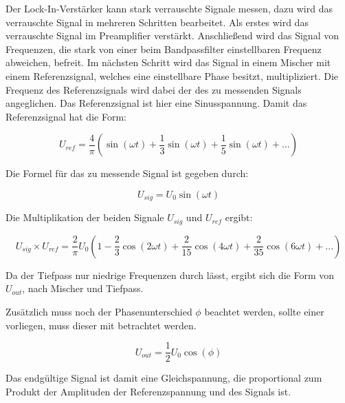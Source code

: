 Der Lock-In-Verstärker kann stark verrauschte Signale messen, dazu wird das verrauschte Signal in mehreren Schritten bearbeitet. Als erstes wird das verrauschte Signal im Preamplifier verstärkt. Anschließend wird das Signal von Frequenzen, die stark von einer beim Bandpassfilter einstellbaren Frequenz abweichen, befreit.
Im nächsten Schritt wird das Signal in einem Mischer mit einem
Referenzsignal, welches eine einstellbare Phase besitzt, multipliziert. Die Frequenz des Referenzsignals wird dabei der des zu messenden Signals angeglichen. Das Referenzsignal ist hier eine Sinusspannung. 
Damit das Referenzsignal hat die Form:

\begin{equation}
  \label{eq:ref}
  U_{ref} = \frac{4}{\pi} \left( \sin(\omega t) + \frac{1}{3} \sin(\omega t) + \frac{1}{5} \sin(\omega t) + ... \right)
\end{equation}

Die Formel für das zu messende Signal ist gegeben durch:

\begin{equation}
  \label{eq:sig}
  U_{sig} = U_{0} \sin(\omega t)
\end{equation}

Die Multiplikation der beiden Signale $U_{sig}$ und $U_{ref}$ ergibt:

\begin{equation*}
  U_{sig} \times U_{ref} = \frac{2}{\pi} U_{0} \left(1 - \frac{2}{3} \cos(2\omega t) + \frac{2}{15} \cos(4\omega t) + \frac{2}{35} \cos(6\omega t) + ... \right)
\end{equation*}

Da der Tiefpass nur niedrige Frequenzen durch lässt, ergibt sich die Form von $U_{out}$, nach Mischer und Tiefpass.

Zusätzlich muss noch der Phasenunterschied $\phi$ beachtet werden, sollte einer vorliegen, muss dieser mit betrachtet werden.

\begin{equation}
  \label{eq:out}
   U_{out} = \frac{1}{2} U_{0} \cos(\phi)
\end{equation}

Das endgültige Signal ist damit eine Gleichspannung, die proportional zum
Produkt der Amplituden der Referenzspannung und des Signals ist.
